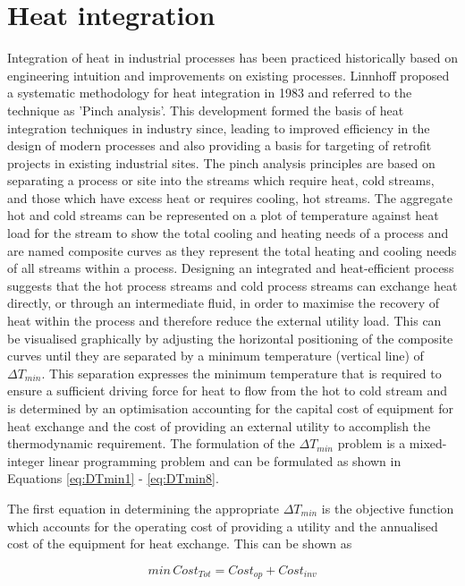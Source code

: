 
\section{Heat integration}
Integration of heat in industrial processes has been practiced historically based on engineering intuition and improvements on existing processes. Linnhoff proposed a systematic methodology for heat integration in 1983 and referred to the technique as 'Pinch analysis'. This development formed the basis of heat integration techniques in industry since, leading to improved efficiency in the design of modern processes and also providing a basis for targeting of retrofit projects in existing industrial sites. The pinch analysis principles are based on separating a process or site into the streams which require heat, cold streams, and those which have excess heat or requires cooling, hot streams. The aggregate hot and cold streams can be represented on a plot of temperature against heat load for the stream to show the total cooling and heating needs of a process and are named composite curves as they represent the total heating and cooling needs of all streams within a process. Designing an integrated and heat-efficient process suggests that the hot process streams and cold process streams can exchange heat directly, or through an intermediate fluid, in order to maximise the recovery of heat within the process and therefore reduce the external utility load. This can be visualised graphically by adjusting the horizontal positioning of the composite curves until they are separated by a minimum temperature (vertical line) of $\Delta T_{min}$. This separation expresses the minimum temperature that is required to ensure a sufficient driving force for heat to flow from the hot to cold stream and is determined by an optimisation accounting for the capital cost of equipment for heat exchange and the cost of providing an external utility to accomplish the thermodynamic requirement. The formulation of the $\Delta T_{min}$ problem is a mixed-integer linear programming problem and can be formulated as shown in Equations \ref{eq:DTmin1} - \ref{eq:DTmin8}.

The first equation in determining the appropriate $\Delta T_{min}$ is the objective function which accounts for the operating cost of providing a utility and the annualised cost of the equipment for heat exchange. This can be shown as

\begin{equation}\label{eq:DTmin1}
min \, Cost_{Tot}= Cost_{op}+Cost_{inv}
\end{equation}